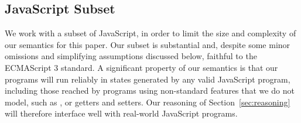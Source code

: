 \documentclass{article}
\begin{document}





























\subsection{JavaScript Subset}\label{sec:differences}
%
%
We work with a subset of JavaScript, in order to limit the size and complexity of our semantics for this paper.
Our subset is substantial and, despite some minor omissions and simplifying assumptions discussed below,  faithful to the ECMAScript 3 standard. 
A significant property of our semantics is that our programs will run reliably in states generated by any valid JavaScript program, including those reached by programs using non-standard features that we do not model, such as ,  or getters and setters.
Our reasoning of Section~\ref{sec:reasoning} will therefore interface well with real-world JavaScript programs.
\end{document}
